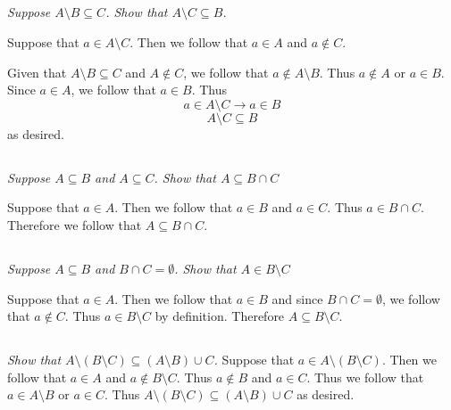 \documentclass[11pt,oneside,titlepage]{book}
\begin{document}
\subsection{}

\textit{Suppose $A \setminus B \subseteq C$. Show that $A \setminus C \subseteq B$.}

Suppose that $a \in A \setminus C$. Then we follow that $a \in A$ and $a \notin C$.

Given that $A \setminus B \subseteq C$ and $A \notin C$, we follow that $a \notin A \setminus B$.
Thus $a \notin A$ or $a \in B$. Since $a \in A$, we follow that $a \in B$. Thus
$$a \in A \setminus C \to a \in B$$
$$A \setminus C \subseteq  B$$
as desired.

\subsection{}

\textit{Suppose $A \subseteq B$ and $A \subseteq C$. Show that $A \subseteq B \cap C$}

Suppose that $a \in A$. Then we follow that $a \in B$ and $a \in C$. Thus $a \in B \cap C$.
Therefore we follow that $A \subseteq B \cap C$.

\subsection{}

\textit{Suppose $A \subseteq B$ and $B \cap C = \emptyset$. Show that $A \in B \setminus C$}

Suppose that $a \in A$. Then we follow that $a \in B$ and since $B \cap C = \emptyset$, we
follow that $a \notin C$. Thus $a \in B \setminus C$ by definition. Therefore
$A \subseteq B \setminus C$.

\subsection{}

\textit{Show that $A \setminus (B \setminus C) \subseteq (A \setminus B) \cup C$.}
Suppose that $a \in A \setminus (B \setminus C)$. Then we follow that
$a \in A$ and $a \notin B \setminus C$. Thus $a \notin B$ and $a \in C$. Thus we
follow that $a \in A \setminus B$ or $a \in C$. Thus
$A \setminus (B \setminus C) \subseteq (A \setminus B) \cup C$
as desired.

\subsection{}
\end{document}
